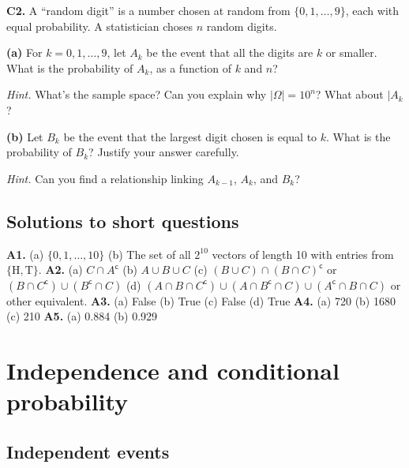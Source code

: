 \documentclass[
  a4paper,
]{book}
\theoremstyle{definition}
\theoremstyle{definition}
\theoremstyle{definition}
\theoremstyle{definition}
\theoremstyle{remark}
\begin{document}
\textbf{C2.} A ``random digit'' is a number chosen at random from \(\{0, 1, \dots, 9\}\), each with equal probability. A statistician choses \(n\) random digits.

\textbf{(a)} For \(k = 0, 1, \dots, 9\), let \(A_k\) be the event that all the digits are \(k\) or smaller. What is the probability of \(A_k\), as a function of \(k\) and \(n\)?

\begin{myanswers}
\emph{Hint.}
What's the sample space? Can you explain why \(|\Omega| = 10^n\)? What about \(|A_k\)\textbar?

\end{myanswers}

\textbf{(b)} Let \(B_k\) be the event that the largest digit chosen is equal to \(k\). What is the probability of \(B_k\)? Justify your answer carefully.

\begin{myanswers}
\emph{Hint.}
Can you find a relationship linking \(A_{k-1}\), \(A_k\), and \(B_k\)?

\end{myanswers}

\hypertarget{P2-short-sols}{%
\section*{Solutions to short questions}\label{P2-short-sols}}

\textbf{A1.} (a) \(\{0,1,\dots, 10\}\) (b) The set of all \(2^{10}\) vectors of length 10 with entries from \(\{\text{H}, \text{T}\}\). \textbf{A2.} (a) \(C \cap A^\mathsf{c}\) (b) \(A \cup B \cup C\) (c) \((B \cup C) \cap (B \cap C)^\mathsf{c}\) or \((B \cap C^\mathsf{c}) \cup (B^\mathsf{c}\cap C)\) (d) \((A \cap B \cap C^\mathsf{c}) \cup (A \cap B^\mathsf{c}\cap C) \cup (A^\mathsf{c}\cap B \cap C)\) or other equivalent. \textbf{A3.} (a) False (b) True (c) False (d) True \textbf{A4.} (a) 720 (b) 1680 (c) 210 \textbf{A5.} (a) 0.884 (b) 0.929

\hypertarget{S04-conditional}{%
\chapter{Independence and conditional probability}\label{S04-conditional}}

\hypertarget{independent-events}{%
\section{Independent events}\label{independent-events}}
\end{document}
